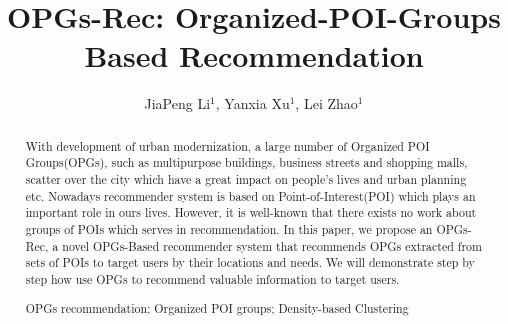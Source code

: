 \documentclass[envcountreset,oribibl]{llncs}
\newcommand{\keywords}[1]{\par\addvspace\baselineskip
\noindent\keywordname\enspace\ignorespaces#1}
\begin{document}


\mainmatter  %

\title{OPGs-Rec: Organized-POI-Groups Based Recommendation}


%
%
\author{JiaPeng Li$^{1}$, Yanxia Xu$^{1}$, Lei Zhao$^{1}$}
%


%
%

\maketitle


\begin{abstract}
With development of urban modernization, a large number of Organized POI Groups(OPGs), such as multipurpose buildings, business streets and shopping malls, scatter over the city which have a great impact on people's lives and urban planning etc. Nowadays recommender system is based on Point-of-Interest(POI) which plays an important role in ours lives. However, it is well-known that there exists no work about groups of POIs which serves in recommendation. In this paper, we propose an OPGs-Rec, a novel OPGs-Based recommender system that recommends OPGs extracted from sets of POIs to target users by their locations and needs. We will demonstrate step by step how use OPGs to recommend valuable information to target users.
\keywords{OPGs recommendation; Organized POI groups; Density-based Clustering}
\end{abstract}
\end{document}

